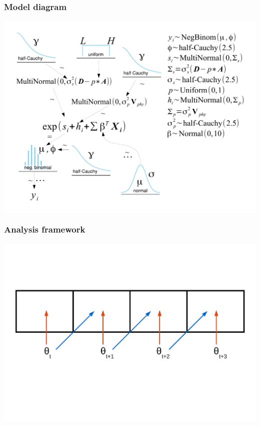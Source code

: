 \documentclass{beamer}
\begin{document}
\begin{frame}
  \frametitle{Model diagram}
  \begin{center}
    \includegraphics[height = 0.8\textheight, width = \textwidth,  keepaspectratio = true]{figure/mammal_deg_over_model}
  \end{center}
\end{frame}

\begin{frame}
  \frametitle{Analysis framework}
  \begin{center}
    \includegraphics[height = 0.8\textheight, width = \textwidth,  keepaspectratio = true]{figure/predict_perform}
  \end{center}
\end{frame}
\end{document}
